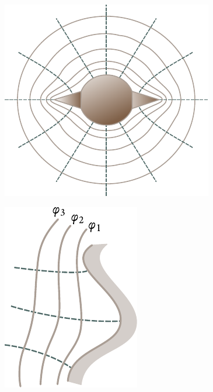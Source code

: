 \begin{figure}[t]
	\begin{minipage}[t]{0.48\linewidth}
		\begin{center}
			\includegraphics[scale=1]{figures/ch_03/fig_3_2.pdf}
			\caption[]{}
			\label{fig:3_2}
		\end{center}
	\end{minipage}
	\hfill{ }%
	\begin{minipage}[t]{0.48\linewidth}
		\begin{center}
			\includegraphics[scale=1]{figures/ch_03/fig_3_3.pdf}
			\caption[]{}
			\label{fig:3_3}
		\end{center}
	\end{minipage}
\vspace{-0.4cm}
\end{figure}

